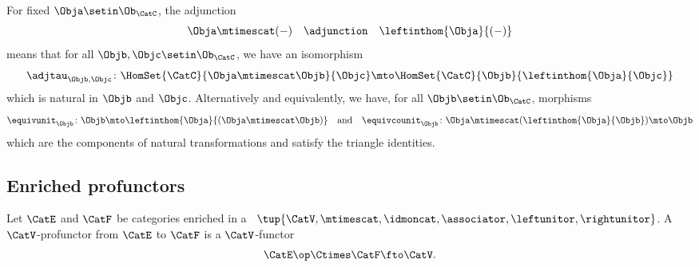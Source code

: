 \begin{remark}
\label{rem:left-internal-hom-unpacked}
For fixed $\Obja \setin \Ob_\CatC$, the adjunction 
\begin{equation}
\Obja \mtimescat ( - ) \quad  \adjunction \quad \leftinthom{\Obja}{( - )}
\end{equation}
means that for all $\Objb, \Objc \setin \Ob_\CatC$, we have an isomorphism
\begin{equation}
\adjtau_{\Objb,\Objc} \colon \HomSet{\CatC}{\Obja \mtimescat \Objb}{\Objc} \mto \HomSet{\CatC}{\Objb}{\leftinthom{\Obja}{\Objc}}  
\end{equation}
which is natural in $\Objb$ and $\Objc$. Alternatively and equivalently, we have, for all $\Objb \setin \Ob_\CatC$, morphisms 
\begin{equation}
\equivunit_\Objb \colon \Objb \mto \leftinthom{\Obja}{(\Obja \mtimescat \Objb)} \quad \text{and} \quad \equivcounit_\Objb \colon \Obja \mtimescat (\leftinthom{\Obja}{\Objb}) \mto \Objb
\end{equation}
which are the components of natural transformations and satisfy the triangle identities.
\end{remark}


\subsection{Enriched profunctors}
\begin{ctdefinition}
\label{def:enriched_profunctor}
    Let $\CatE$ and $\CatF$ be categories enriched in a ~$\tup{\CatV, \mtimescat, \idmoncat, \associator, \leftunitor, \rightunitor}$. A $\CatV$-profunctor from $\CatE$ to $\CatF$ is a $\CatV$-functor
    \begin{equation}
\CatE\op \Ctimes \CatF \fto \CatV.
\end{equation}
\end{ctdefinition}








